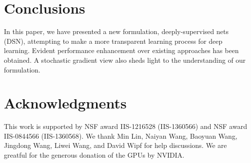 \documentclass{article} %
\begin{document}
\vspace{-2mm}
\section{Conclusions}
\vspace{-1mm}
In this paper, we have presented a new formulation, deeply-supervised nets (DSN), attempting to make a more transparent learning process for deep learning. Evident performance enhancement over existing approaches has been obtained. A stochastic gradient view also sheds light to the understanding of our formulation.

\section{Acknowledgments}
This work is supported by NSF award IIS-1216528 (IIS-1360566) and NSF award IIS-0844566 (IIS-1360568). We thank Min Lin, Naiyan Wang, Baoyuan Wang, Jingdong Wang, Liwei Wang, and David Wipf for help discussions. We are greatful for the generous donation of the GPUs by NVIDIA.


\small{


}
\end{document}
